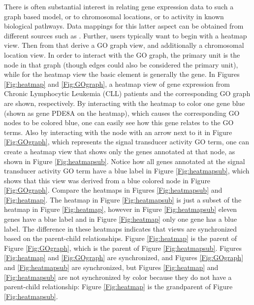 \documentclass[11pt]{article}
\begin{document}
There is often substantial interest in relating gene expression data
to such a graph based model, or to chromosomal locations, or to
activity in known biological pathways. Data mappings for this latter
aspect can be obtained from different sources such as \cite{KEGG}.
Further, users typically want to begin with a heatmap view. Then from
that derive a GO graph view, and additionally a chromosomal location
view. In order to interact with the GO graph, the primary unit is the
node in that graph (though edges could also be considered the primary 
unit), while
for the heatmap view the basic element is generally the gene.  In Figures
\ref{Fig:heatmap} and \ref{Fig:GOgraph}, a heatmap view of gene expression
from Chronic Lymphocytic Leukemia (CLL) patients and the corresponding GO
graph are shown, respectively.  By interacting with the heatmap to color one
gene blue (shown as gene PDE8A on the heatmap), which causes the corresponding
GO nodes to be colored blue, one can easily see how this gene relates to the
GO terms.  Also by interacting with the node with an arrow next to it in
Figure \ref{Fig:GOgraph}, which represents the signal transducer activity GO
term, one can create a heatmap view that shows only the genes annotated at
that node, as shown in Figure \ref{Fig:heatmapsub}.  Notice how all genes
annotated at the signal transducer activity GO term have a blue label in
Figure \ref{Fig:heatmapsub}, which shows that this view was derived from a
blue colored node in Figure \ref{Fig:GOgraph}.  Compare the heatmaps in
Figures \ref{Fig:heatmapsub} and \ref{Fig:heatmap}.  The heatmap in Figure
\ref{Fig:heatmapsub} is just a subset of the heatmap in Figure
\ref{Fig:heatmap}, however in Figure \ref{Fig:heatmapsub} eleven genes have a
blue label and in Figure \ref{Fig:heatmap} only one gene has a blue label.
The difference in these heatmaps indicates that views are synchronized based
on the parent-child relationships.  Figure \ref{Fig:heatmap} is the parent of
Figure \ref{Fig:GOgraph}, which is the parent of Figure \ref{Fig:heatmapsub}.
Figures \ref{Fig:heatmap} and \ref{Fig:GOgraph} are synchronized, and Figures
\ref{Fig:GOgraph} and \ref{Fig:heatmapsub} are synchronized, but Figures
\ref{Fig:heatmap} and \ref{Fig:heatmapsub} are not synchronized by color
because they do not have a parent-child relationship: Figure \ref{Fig:heatmap}
is the grandparent of Figure \ref{Fig:heatmapsub}.
\end{document}
